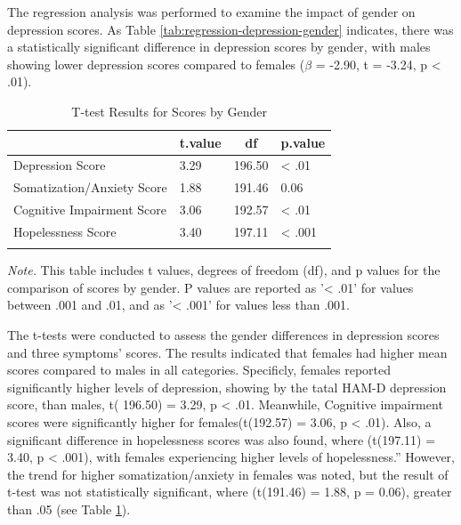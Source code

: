 \documentclass[
  man,floatsintext]{apa6}
\begin{document}
The regression analysis was performed to examine the impact of gender on depression scores. As Table \ref{tab:regression-depression-gender} indicates, there was a statistically significant difference in depression scores by gender, with males showing lower depression scores compared to females (\(\beta\) = -2.90, t = -3.24, p \textless{} .01).

\begin{table}[tbp]

\begin{center}
\begin{threeparttable}

\caption{\label{tab:ttest-scores-gender}T-test Results for Scores by Gender}

\begin{tabular}{llll}
\toprule
 & \multicolumn{1}{c}{t.value} & \multicolumn{1}{c}{df} & \multicolumn{1}{c}{p.value}\\
\midrule
Depression Score & 3.29 & 196.50 & < .01\\
Somatization/Anxiety Score & 1.88 & 191.46 & 0.06\\
Cognitive Impairment Score & 3.06 & 192.57 & < .01\\
Hopelessness Score & 3.40 & 197.11 & < .001\\
\bottomrule
\addlinespace
\end{tabular}

\begin{tablenotes}[para]
\normalsize{\textit{Note.} This table includes t values, degrees of freedom (df), and p values for the comparison of scores by gender. P values are reported as '< .01' for values between .001 and .01, and as '< .001' for values less than .001.}
\end{tablenotes}

\end{threeparttable}
\end{center}

\end{table}

The t-tests were conducted to assess the gender differences in depression scores and three symptoms' scores. The results indicated that females had higher mean scores compared to males in all categories. Specificly, females reported significantly higher levels of depression, showing by the tatal HAM-D depression score, than males, t( 196.50) = 3.29, p \textless{} .01.
Meanwhile, Cognitive impairment scores were significantly higher for females(t(192.57) = 3.06, p \textless{} .01). Also, a significant difference in hopelessness scores was also found, where (t(197.11) = 3.40, p \textless{} .001), with females experiencing higher levels of hopelessness.''
However, the trend for higher somatization/anxiety in females was noted, but the result of t-test was not statistically significant, where (t(191.46) = 1.88, p = 0.06), greater than .05 (see Table \ref{tab:ttest-scores-gender}).
\end{document}
